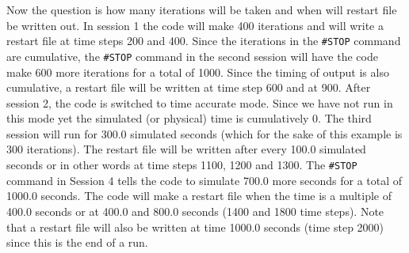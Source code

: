 Now the question is how many iterations will be taken and when will restart
file be written out.  In session 1 the code will make 400 iterations and will
write a restart file at time steps 200 and 400.  Since the iterations 
in the {\tt \#STOP}
command are cumulative, the {\tt \#STOP} command in the second session will
have the code make 600 more iterations for a total of 1000.  Since the timing
of output is also cumulative, a restart file will be written at time step 600
and at 900.
After session 2, the code is switched to time accurate mode.  Since we
have not run in this mode yet the simulated (or physical) time is cumulatively
0.  The third session will run for 300.0 simulated seconds (which for the
sake of this example is 300 iterations).  The restart file will be written
after every 100.0 simulated seconds or in other words at time steps
1100, 1200 and 1300.
The {\tt \#STOP} command in Session 4  tells the code to simulate  700.0 more 
seconds for a total of 1000.0 seconds.  The code will make a restart file
when the time is a multiple of 400.0 seconds or at 400.0 and 800.0 seconds (1400 and
1800 time steps).  Note that a restart file will also be written at time 1000.0
seconds
(time step 2000) since this is the end of a run.

